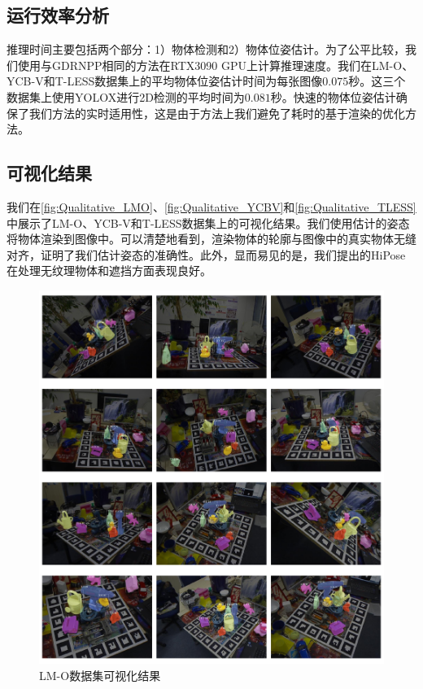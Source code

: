 \subsection{运行效率分析}

推理时间主要包括两个部分：1）物体检测和2）物体位姿估计。为了公平比较，我们使用与GDRNPP相同的方法在RTX3090 GPU上计算推理速度。我们在LM-O、YCB-V和T-LESS数据集上的平均物体位姿估计时间为每张图像$0.075$秒。这三个数据集上使用YOLOX\cite{Ge2021YOLOXEY}进行2D检测的平均时间为$0.081$秒。快速的物体位姿估计确保了我们方法的实时适用性，这是由于方法上我们避免了耗时的基于渲染的优化方法。

\subsection{可视化结果}
我们在\autoref{fig:Qualitative_LMO}、\autoref{fig:Qualitative_YCBV}和\autoref{fig:Qualitative_TLESS}中展示了LM-O\cite{Brachmann2016UncertaintyDriven6P}、YCB-V\cite{ycbv}和T-LESS\cite{tless}数据集上的可视化结果。我们使用估计的姿态将物体渲染到图像中。可以清楚地看到，渲染物体的轮廓与图像中的真实物体无缝对齐，证明了我们估计姿态的准确性。此外，显而易见的是，我们提出的HiPose在处理无纹理物体和遮挡方面表现良好。

\begin{figure}
    \centering
    \includegraphics[width=1\linewidth]{figure/hipose/lmo_visulize.pdf}
    \caption{LM-O数据集可视化结果}
    \label{fig:Qualitative_LMO}
\end{figure}

